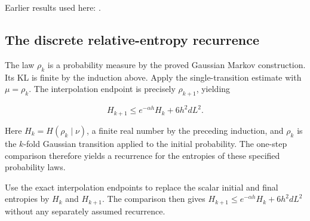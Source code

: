 \documentclass[11pt,a4paper]{report}
\begin{document}
Earlier results used here: \cite[Section~3.26.3]{LangevinLean2026ULASC}.
\subsection{\texorpdfstring{The discrete relative-entropy recurrence}{The discrete relative-entropy recurrence}}
\label{report-step-UnadjustedLangevin-LSI-UnconditionalTheorem-lean-6}


The law \(\rho_k\) is a probability measure by the proved Gaussian Markov construction. Its KL is finite by the induction above. Apply the single-transition estimate with \(\mu=\rho_k\). The interpolation endpoint is precisely \(\rho_{k+1}\), yielding

\[H_{k+1}\le e^{-\alpha h}H_k+6h^2dL^2.\]

Here \(H_k=H(\rho_k\mid\nu)\), a finite real number by the preceding induction, and \(\rho_k\) is the \(k\)-fold Gaussian transition applied to the initial probability. The one-step comparison therefore yields a recurrence for the entropies of these specified probability laws.



Use the exact interpolation endpoints to replace the scalar initial and final entropies by \(H_k\) and \(H_{k+1}\). The comparison then gives \(H_{k+1}\le e^{-\alpha h}H_k+6h^2dL^2\) without any separately assumed recurrence.
\end{document}
